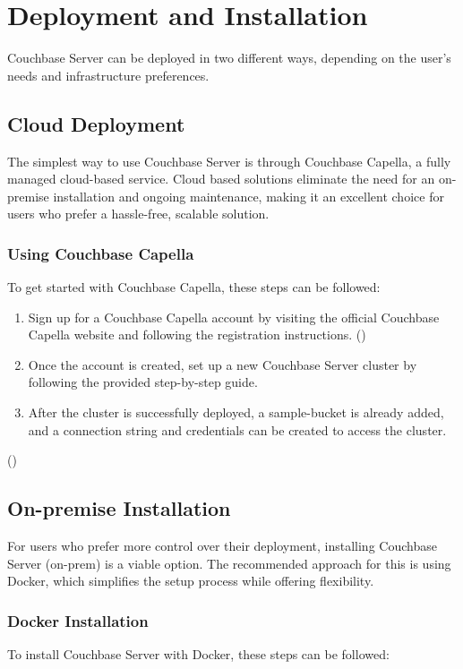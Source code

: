 \newpage
\chapter{Deployment and Installation}

Couchbase Server can be deployed in two different ways, depending on the user's needs and infrastructure preferences.

\section{Cloud Deployment}
The simplest way to use Couchbase Server is through Couchbase Capella, a fully managed cloud-based service. Cloud based solutions eliminate the need for an on-premise installation and ongoing maintenance, making it an excellent choice for users who prefer a hassle-free, scalable solution.

\subsection{Using Couchbase Capella}
To get started with Couchbase Capella, these steps can be followed:

\begin{enumerate}
  \item Sign up for a Couchbase Capella account by visiting the official Couchbase Capella website and following the registration instructions. (\cite{couchbaseCapellaSignUp})
  \item Once the account is created, set up a new Couchbase Server cluster by following the provided step-by-step guide.
  \item After the cluster is successfully deployed, a sample-bucket is already added, and a connection string and credentials can be created to access the cluster.
\end{enumerate}
(\cite{couchbaseCapellaGettingStarted})

\section{On-premise Installation}
For users who prefer more control over their deployment, installing Couchbase Server (on-prem) is a viable option. The recommended approach for this is using Docker, which simplifies the setup process while offering flexibility.

\subsection{Docker Installation}
To install Couchbase Server with Docker, these steps can be followed:

